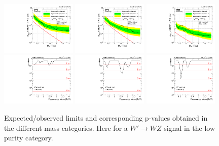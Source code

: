 \begin{figure}[h!]
\centering
\includegraphics[width=0.32\textwidth]{figures/analysis/search1/AN-15-211/limits/brazilianFlag_WZ_WWLP_13TeV_wPDF.pdf}
\includegraphics[width=0.32\textwidth]{figures/analysis/search1/AN-15-211/limits/brazilianFlag_WZ_WZLP_13TeV_wPDF.pdf}
\includegraphics[width=0.32\textwidth]{figures/analysis/search1/AN-15-211/limits/brazilianFlag_WZ_ZZLP_13TeV_wPDF.pdf}\\
\includegraphics[width=0.32\textwidth]{figures/analysis/search1/AN-15-211/pvalues/pvalue_WZinWW_low_purity.pdf}
\includegraphics[width=0.32\textwidth]{figures/analysis/search1/AN-15-211/pvalues/pvalue_WZinWZ_low_purity.pdf}
\includegraphics[width=0.32\textwidth]{figures/analysis/search1/AN-15-211/pvalues/pvalue_WZinZZ_low_purity.pdf}
\caption{Expected/observed limits and corresponding p-values obtained in the different mass categories. Here for a $W'\rightarrow WZ$ signal in the low purity category.}
\label{fig:searchI:Limits_LPWZ}
\end{figure}




